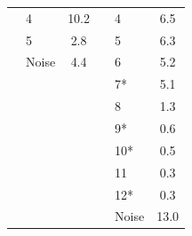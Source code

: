 \begin{table}[h!]
\begin{adjustbox}{max width=\textwidth}
\begin{tabular}{c|lc||c|lc}
                          & 4       & 10.2        &                           & 4       & 6.5         \\
                          & 5       & 2.8         &                           & 5       & 6.3         \\
                          & Noise   & 4.4         &                           & 6       & 5.2         \\
                          &         &             &                           & 7*      & 5.1         \\
                          &         &             &                           & 8       & 1.3         \\
                          &         &             &                           & 9*      & 0.6         \\
                          &         &             &                           & 10*     & 0.5         \\
                          &         &             &                           & 11      & 0.3         \\
                          &         &             &                           & 12*     & 0.3         \\
                          &         &             &                           & Noise   & 13.0       
\end{tabular}%
\end{adjustbox}
\end{table}


